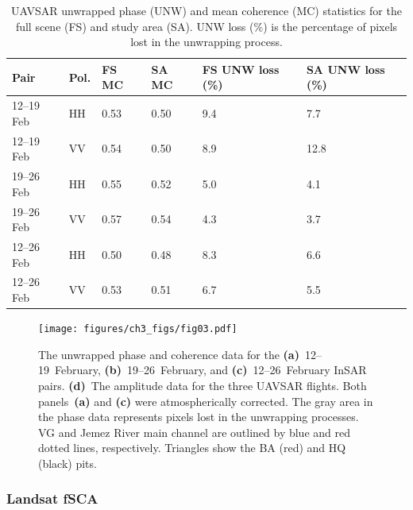 \begin{table}[t]
\centering
\caption{UAVSAR unwrapped phase (UNW) and mean coherence (MC) statistics for the full scene (FS) and study area (SA). UNW loss (\%) is the percentage of pixels lost in the unwrapping process.}
\begin{tabular}{l l l l l l}
\toprule
Pair & Pol. & FS MC & SA MC & FS UNW loss (\%) & SA UNW loss (\%) \\
\midrule
12--19 Feb & HH & 0.53 & 0.50 & 9.4 & 7.7 \\
12--19 Feb & VV & 0.54 & 0.50 & 8.9 & 12.8 \\
19--26 Feb & HH & 0.55 & 0.52 & 5.0 & 4.1 \\
19--26 Feb & VV & 0.57 & 0.54 & 4.3 & 3.7 \\
12--26 Feb & HH & 0.50 & 0.48 & 8.3 & 6.6 \\
12--26 Feb & VV & 0.53 & 0.51 & 6.7 & 5.5 \\
\bottomrule
\end{tabular}
\end{table}

\begin{figure}[t]
\centering
\texttt{[image: figures/ch3\_figs/fig03.pdf]}
\caption{The unwrapped phase and coherence data for the \textbf{(a)}~12--19~February, \textbf{(b)}~19--26~February, and \textbf{(c)}~12--26~February InSAR pairs. \textbf{(d)}~The amplitude data for the three UAVSAR flights. Both panels~\textbf{(a)} and \textbf{(c)} were atmospherically corrected. The gray area in the phase data represents pixels lost in the unwrapping processes. VG and Jemez River main channel are outlined by blue and red dotted lines, respectively. Triangles show the BA (red) and HQ (black) pits.}
\end{figure}
\clearpage


\hypertarget{ch3-methods-6}{\subsubsection{Landsat fSCA}\label{ch3-methods-6}}


